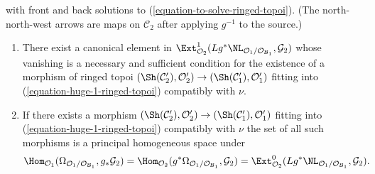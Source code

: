 \begin{lemma}
\begin{equation}
{}
\end{equation}
with front and back solutions to (\ref{equation-to-solve-ringed-topoi}).
(The north-north-west arrows are maps on $\mathcal{C}_2$ after applying
$g^{-1}$ to the source.)
\begin{enumerate}
\item There exist a canonical element in
$\Ext^1_{\mathcal{O}_2}(
Lg^*\NL_{\mathcal{O}_1/\mathcal{O}_{\mathcal{B}_1}}, \mathcal{G}_2)$
whose vanishing is a necessary and sufficient condition for the existence
of a morphism of ringed topoi
$(\Sh(\mathcal{C}'_2), \mathcal{O}'_2) \to
(\Sh(\mathcal{C}'_1), \mathcal{O}'_1)$ fitting into
(\ref{equation-huge-1-ringed-topoi}) compatibly with $\nu$.
\item If there exists a morphism
$(\Sh(\mathcal{C}'_2), \mathcal{O}'_2) \to
(\Sh(\mathcal{C}'_1), \mathcal{O}'_1)$
fitting into
(\ref{equation-huge-1-ringed-topoi}) compatibly with $\nu$ the set
of all such morphisms is a principal homogeneous space under
$$
\Hom_{\mathcal{O}_1}(
\Omega_{\mathcal{O}_1/\mathcal{O}_{\mathcal{B}_1}}, g_*\mathcal{G}_2) =
\Hom_{\mathcal{O}_2}(
g^*\Omega_{\mathcal{O}_1/\mathcal{O}_{\mathcal{B}_1}}, \mathcal{G}_2) =
\Ext^0_{\mathcal{O}_2}(
Lg^*\NL_{\mathcal{O}_1/\mathcal{O}_{\mathcal{B}_1}}, \mathcal{G}_2).
$$
\end{enumerate}
\end{lemma}

